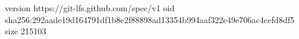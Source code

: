 version https://git-lfs.github.com/spec/v1
oid sha256:292aade19d164791df1b8e2f88898ad13354b994aaf322e49e706ac4cefd8df5
size 215103
